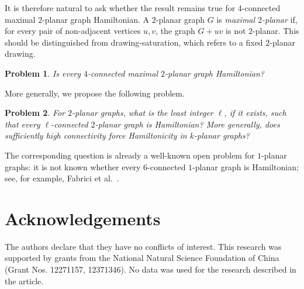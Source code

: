 \documentclass[12pt,a4paper]{article}
\theoremstyle{plain}
\newtheorem{prob}{Problem}[section]
\begin{document}
It is therefore natural to ask whether the result remains true for \(4\)-connected maximal \(2\)-planar graph Hamiltonian. A \(2\)-planar graph \(G\) is \emph{maximal \(2\)-planar} if, for every pair of non-adjacent vertices \(u,v\), the graph \(G+uv\) is not \(2\)-planar. 
This should be distinguished from drawing-saturation, which refers to a fixed \(2\)-planar drawing.

\begin{prob}
Is every \(4\)-connected maximal \(2\)-planar graph Hamiltonian?
\end{prob}

More generally, we propose the following problem.
\begin{prob}
For \(2\)-planar graphs, what is the least integer \(\ell\), if it exists, such that every \(\ell\)-connected \(2\)-planar graph is Hamiltonian? 
More generally, does sufficiently high connectivity force Hamiltonicity in \(k\)-planar graphs?
\end{prob}

The corresponding question is already a well-known open problem for \(1\)-planar graphs: it is not known whether every \(6\)-connected \(1\)-planar graph is Hamiltonian; see, for example, Fabrici et al.~\cite{MR4130388}.


\section*{Acknowledgements}




The authors declare that they have no conflicts of interest. This research was supported by grants from the National Natural Science Foundation of China (Grant Nos. 12271157, 12371346).  No data was used for the research described in the article.
\end{document}
